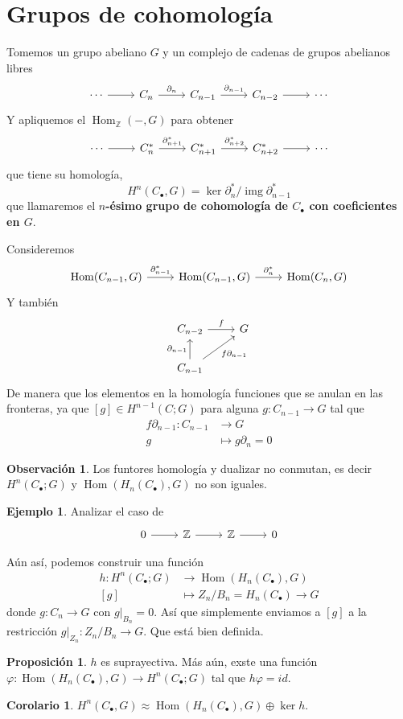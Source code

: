 \documentclass[spanish]{book}
\theoremstyle{definition}
\newtheorem*{obs}{Observación}
\newtheorem*{prop}{Proposición}
\newtheorem*{coro}{Corolario}
\newtheorem*{ejem}{Ejemplo}
\newcommand{\Z}{\mathbb{Z}}
\DeclareMathOperator{\img}{img}
\DeclareMathOperator{\Hom}{Hom}
\begin{document}
\section{Grupos de cohomología}
Tomemos un grupo abeliano $G$ y un complejo de cadenas de grupos abelianos libres
\[\begin{tikzcd}
	\cdots\arrow[r]&C_n\arrow[r,"\partial_n"]&C_{n-1}\arrow[r,"\partial_{n-1}"]&C_{n-2}\arrow[r]&\cdots
\end{tikzcd}\]
Y apliquemos el $\Hom_\Z(-,G)$ para obtener
\[\begin{tikzcd}
	\cdots\arrow[r]&C_n^*\arrow[r,"\partial_{n+1}^*"]&C_{n+1}^*\arrow[r,"\partial^*_{n+2}"]&C_{n+2}^*\arrow[r]&\cdots
\end{tikzcd}\]
que tiene su homología,
\[H^n(C_\bullet,G)=\ker\partial_n^*/\img\partial^*_{n-1}\]
que llamaremos el \textbf{$n$-ésimo grupo de cohomología de $C_\bullet$ con coeficientes en $G$}.

Consideremos
\[\begin{tikzcd}
	\Hom(C_{n-1},G)\arrow[r,"\partial_{n-1}^*"]&\Hom(C_{n-1},G)\arrow[r,"\partial_n^*"]&\Hom(C_n,G)
\end{tikzcd}\]
Y también
\[\begin{tikzcd}
	C_{n-2}\arrow[r,"f"]&G\\
	C_{n-1}\arrow[u,"\partial_{n-1}"]\arrow[ur,"f\partial_{n-1}",swap]
\end{tikzcd}\]
De manera que los elementos en la homología funciones que se anulan en las fronteras, ya que $[g]\in H^{n-1}(C;G)$ para alguna $g:C_{n-1}\to G$ tal que
\begin{align*}
	f\partial_{n-1}:C_{n-1}&\to G\\
	g&\mapsto g\partial_n=0
\end{align*}
\begin{obs}
	Los funtores homología y dualizar no conmutan, es decir $H^n(C_\bullet;G)$ y $\Hom(H_n(C_\bullet),G)$ no son iguales.
\end{obs}
\begin{ejem}
	Analizar el caso de 
	\[\begin{tikzcd}
		0\arrow[r]&\Z\arrow[r]&\Z\arrow[r]&0
	\end{tikzcd}\]
\end{ejem}
Aún así, podemos construir una función
\begin{align*}
	h:H^n(C_\bullet;G)&\to\Hom(H_n(C_\bullet),G)\\
	[g]&\mapsto Z_n/B_n=H_n(C_\bullet)\to G
\end{align*}
donde $g:C_n\to G$ con $g|_{B_n}=0 $. Así que simplemente enviamos a $[g]$ a la restricción $g|_{Z_n}:Z_n/B_n\to G$. Que está bien definida.
\begin{prop}
	$h$ es suprayectiva. Más aún, exste una función $\varphi:\Hom(H_n(C_\bullet),G)\to H^n(C_\bullet;G)$ tal que $h\varphi=id$.
\end{prop}
\begin{coro}
	$H^n(C_\bullet,G)\approx\Hom(H_n(C_\bullet),G)\oplus\ker h$.
\end{coro}
\end{document}

